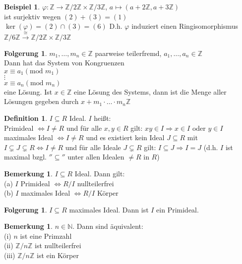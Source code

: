 \documentclass[10pt,a4paper,numbers=endperiod]{scrreprt}
\theoremstyle{definition}
\newtheorem{defi}[satz]{Definition}
\newtheorem{bem}[satz]{Bemerkung}
\newtheorem{bsp}[satz]{Beispiel}
\newtheorem{folg}[satz]{Folgerung}
\def\NN{{\mathbb N}}
\def\ZZ{{\mathbb Z}}
\begin{document}
\begin{bsp}
	$\varphi: \ZZ \rightarrow \ZZ/2\ZZ \times \ZZ/3\ZZ$, $a \mapsto (a + 2\ZZ, a + 3\ZZ)$\\
	ist surjektiv wegen $(2) + (3) = (1)$\\
	$\ker(\varphi) = (2) \cap (3) = (6)$ D.h. $\varphi$ induziert einen Ringisomorphismus 
	$\ZZ/6\ZZ \overset{\cong}{\rightarrow} \ZZ/2\ZZ \times \ZZ/3\ZZ$
\end{bsp}

\begin{folg}
	$m_1, \ldots, m_n \in \ZZ$ paarweise teilerfremd, $a_1, \ldots, a_n \in \ZZ$\\
	Dann hat das System von Kongruenzen\\
	$x \equiv a_1 (\text{mod } m_1)$\\
	$\vdots$\\
	$x \equiv a_n (\text{mod } m_n)$\\
	
	eine Lösung. Ist $x \in \ZZ$ eine Lösung des Systems, dann ist die Menge aller Lösungen gegeben durch $x + m_1 \cdot \ldots \cdot m_n \ZZ$
\end{folg}

\begin{defi}
	$I \subseteq R$ Ideal. $I$ heißt:\\
	Primideal $\Leftrightarrow I \neq R$ und für alle $x,y \in R$ gilt: $xy \in I \Rightarrow x \in I$ oder $y \in I$\\
	maximales Ideal $\Leftrightarrow I \neq R$ und es existiert kein Ideal $J \subseteq R$ mit $I \subsetneq J \subsetneq R \Leftrightarrow I \neq R$ und für alle Ideale $J \subsetneq R$ gilt: $I \subseteq J \Rightarrow I = J$ (d.h. $I$ ist maximal bzgl. $''\subseteq''$ unter allen Idealen $\neq R$ in $R$)
\end{defi}

\begin{bem}
	$I \subseteq R$ Ideal. Dann gilt:\\
	(a) $I$ Primideal $\Leftrightarrow R/I$ nullteilerfrei\\
	(b) $I$ maximales Ideal $\Leftrightarrow R/I$ Körper
\end{bem}

\begin{folg}
	$I \subseteq R$ maximales Ideal. Dann ist $I$ ein Primideal.
\end{folg}

\begin{bem}
	$n \in \NN$. Dann sind äquivalent:\\
	(i) $n$ ist eine Primzahl\\
	(ii) $\ZZ/n\ZZ$ ist nullteilerfrei\\
	(iii) $\ZZ/n\ZZ$ ist ein Körper
\end{bem}
\end{document}
